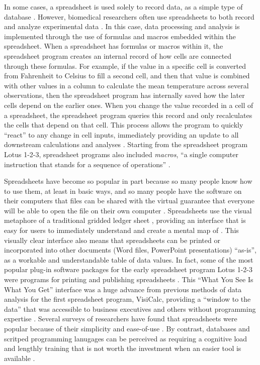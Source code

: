 \documentclass[]{tufte-book}
\begin{document}
In some cases, a spreadsheet is used solely to record data, as a simple type of
database \citep{birch2018future}. However, biomedical researchers often use
spreadsheets to both record and analyze experimental data \citep{anderson2007issues}.
In this case, data processing and analysis is implemented through the use of
formulas and macros embedded within the spreadsheet. When a spreadsheet has
formulas or macros within it, the spreadsheet program creates an internal record
of how cells are connected through these formulas. For example, if the value in
a specific cell is converted from Fahrenheit to Celsius to fill a second cell,
and then that value is combined with other values in a column to calculate the
mean temperature across several observations, then the spreadsheet program has
internally saved how the later cells depend on the earlier ones. When you change
the value recorded in a cell of a spreadsheet, the spreadsheet program queries
this record and only recalculates the cells that depend on that cell. This
process allows the program to quickly ``react'' to any change in cell inputs,
immediately providing an update to all downstream calculations and analyses
\citep{levy1984spreadsheet}. Starting from the spreadsheet program Lotus 1-2-3,
spreadsheet programs also included \emph{macros}, ``a single computer instruction that
stands for a sequence of operations'' \citep{creeth1985microcomputer}.

Spreadsheets have become so popular in part because so many people know how to
use them, at least in basic ways, and so many people have the software on their
computers that files can be shared with the virtual guarantee that everyone will
be able to open the file on their own computer \citep{hermans2016spreadsheets}.
Spreadsheets use the visual metaphore of a traditional gridded ledger sheet
\citep{levy1984spreadsheet}, providing an interface that is easy for users to
immediately understand and create a mental map of \citep{birch2018future, barga2011bioinformatics}. This visually clear interface also means that
spreadsheets can be printed or incorporated into other documents (Word files,
PowerPoint presentations) ``as-is'', as a workable and understandable table of
data values. In fact, some of the most popular plug-in software packages for the
early spreadsheet program Lotus 1-2-3 were programs for printing and publishing
spreadsheets \citep{campbell2007number}. This ``What You See Is What You Get''
interface was a huge advance from previous methods of data analysis for the
first spreadsheet program, VisiCalc, providing a ``window to the data'' that was
accessible to business executives and others without programming expertise
\citep{creeth1985microcomputer}. Several surveys of researchers have found that
spreadsheets were popular because of their simplicity and ease-of-use
\citep{anderson2007issues, altarawneh2017pilot, barga2011bioinformatics}. By
contrast, databases and scritped programming lanugages can be perceived as
requiring a cognitive load and lengthly training that is not worth the
investment when an easier tool is available \citep{hermans2016spreadsheets, anderson2007issues, myneni2010organization, barga2011bioinformatics, topaloglou2004biological}.
\end{document}
